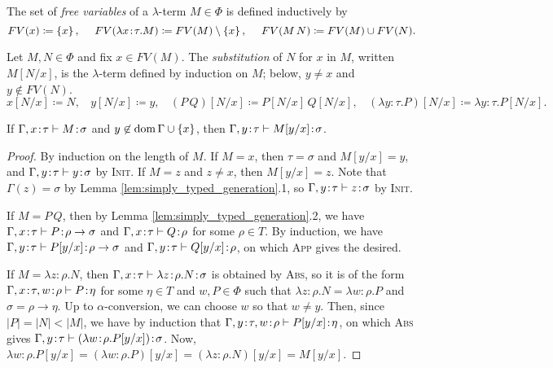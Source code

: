 \documentclass[reqno]{amsart}
\begin{document}
    \begin{definition}
        The set of \textit{free variables} of a $\lambda$-term $M\in\Phi$ is defined inductively by
        \begin{equation*}
            FV(x)\coloneqq\left\{x\right\},\ \ \ \ FV(\lambda x\!:\!\tau.M)\coloneqq FV(M)\setminus\left\{x\right\},\ \ \ \ FV(M\,N)\coloneqq FV(M)\cup FV(N).
        \end{equation*}
    \end{definition}

    \begin{definition}
        Let $M,N\in\Phi$ and fix $x\in FV(M)$. The \textit{substitution} of $N$ for $x$ in $M$, written $M[N/x]$, is the $\lambda$-term defined by induction on $M$; below, $y\neq x$ and $y\not\in FV(N)$.
        \begin{equation*}
            x[N/x]\coloneqq N,\ \ \ \ y[N/x]\coloneqq y,\ \ \ \ (P\,Q)[N/x]\coloneqq P[N/x]\,Q[N/x],\ \ \ \ (\lambda y\!:\!\tau.P)[N/x]\coloneqq\lambda y\!:\!\tau.P[N/x].
        \end{equation*}
    \end{definition}

    \begin{lemma}\label{lem:simply_typed_variable_substitution}
        If $\Gamma,x\!:\!\tau\vdash M\!:\!\sigma$ and $y\not\in\operatorname{dom}\Gamma\cup\left\{x\right\}$, then $\Gamma,y\!:\!\tau\vdash M[y/x]\!:\!\sigma$.
    \end{lemma}
    \begin{proof}
        By induction on the length of $M$. If $M=x$, then $\tau=\sigma$ and $M[y/x]=y$, and $\Gamma,y\!:\!\tau\vdash y\!:\!\sigma$ by \textsc{Init}. If $M=z$ and $z\neq x$, then $M[y/x]=z$. Note that $\Gamma(z)=\sigma$ by Lemma \ref{lem:simply_typed_generation}.1, so $\Gamma,y\!:\!\tau\vdash z\!:\!\sigma$ by \textsc{Init}.

        If $M=P\,Q$, then by Lemma \ref{lem:simply_typed_generation}.2, we have $\Gamma,x\!:\!\tau\vdash P\!:\!\rho\rightarrow\sigma$ and $\Gamma,x\!:\!\tau\vdash Q\!:\!\rho$ for some $\rho\in T$. By induction, we have $\Gamma,y\!:\!\tau\vdash P[y/x]\!:\!\rho\rightarrow\sigma$ and $\Gamma,y\!:\!\tau\vdash Q[y/x]\!:\!\rho$, on which \textsc{App} gives the desired.

        If $M=\lambda z\!:\!\rho.N$, then $\Gamma,x\!:\!\tau\vdash\lambda z\!:\!\rho.N\!:\!\sigma$ is obtained by \textsc{Abs}, so it is of the form $\Gamma,x\!:\!\tau,w\!:\!\rho\vdash P\!:\!\eta$ for some $\eta\in T$ and $w,P\in\Phi$ such that $\lambda z\!:\!\rho.N=\lambda w\!:\!\rho.P$ and $\sigma=\rho\to\eta$. Up to $\alpha$-conversion, we can choose $w$ so that $w\neq y$. Then, since $|P|=|N|<|M|$, we have by induction that $\Gamma,y\!:\!\tau,w\!:\!\rho\vdash P[y/x]\!:\!\eta$, on which \textsc{Abs} gives $\Gamma,y\!:\!\tau\vdash(\lambda w\!:\!\rho.P[y/x])\!:\!\sigma$. Now, $\lambda w\!:\!\rho.P[y/x]=(\lambda w\!:\!\rho.P)[y/x]=(\lambda z\!:\!\rho.N)[y/x]=M[y/x]$.
    \end{proof}
\end{document}
